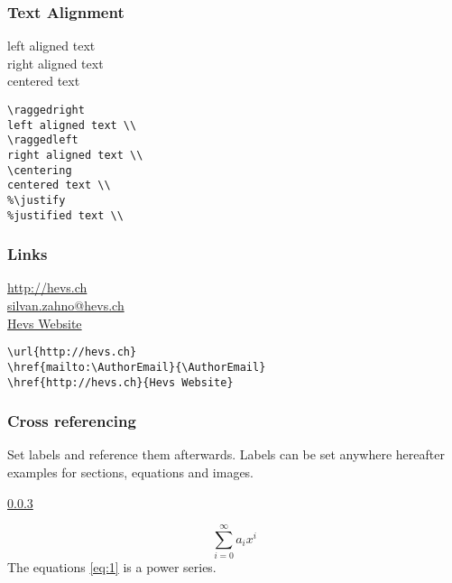 \documentclass[a4paper,11pt,fleqn]{book}
\makeatletter
\renewcommand{\AuthorEmail}{silvan.zahno@hevs.ch}
\makeatother
\begin{document}
\begin{enumerate}
\subsubsection{Text Alignment}
\begin{multicols}{2}
  \raggedright
  left aligned text \\
  \raggedleft
  right aligned text \\
  \centering
  centered text \\

  \vfill\null\columnbreak

  \begin{verbatim}
\raggedright
left aligned text \\
\raggedleft
right aligned text \\
\centering
centered text \\
%\justify
%justified text \\
  \end{verbatim}
\end{multicols}

\subsubsection{Links}
\begin{multicols}{2}
  \url{http://hevs.ch} \\
  \href{mailto:\AuthorEmail}{\AuthorEmail} \\
  \href{http://hevs.ch}{Hevs Website}

  \vfill\null\columnbreak

  \begin{verbatim}
\url{http://hevs.ch}
\href{mailto:\AuthorEmail}{\AuthorEmail}
\href{http://hevs.ch}{Hevs Website}
  \end{verbatim}
\end{multicols}

\subsubsection{Cross referencing} \label{sec:crossref}
Set labels and reference them afterwards. Labels can be set anywhere hereafter examples for sections, equations and images.

\ref{sec:crossref} 

\begin{equation} \label{eq:1}
  \sum_{i=0}^{\infty} a_i x^i
\end{equation}
The equations \ref{eq:1} is a power series.


\end{enumerate}
\end{document}
